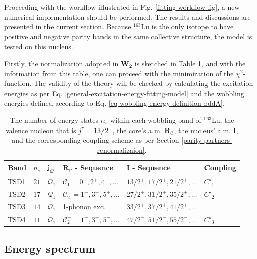 Proceeding with the workflow illustrated in Fig. \ref{fitting-workflow-fig}, a new numerical implementation should be performed. The results and discussions are presented in the current section. Because $^{163}$Lu is the only isotope to have positive and negative parity bands in the same collective structure, the model is tested on this nucleus.

Firstly, the normalization adopted in $\mathbf{W_2}$ is sketched in Table \ref{lu163-table-info}, and with the information from this table, one can proceed with the minimization of the $\chi^2$-function. The validity of the theory will be checked by calculating the excitation energies as per Eq. \ref{general-excitation-energy-fitting-model} and the wobbling energies defined according to Eq. \ref{eq-wobbling-energy-definition-oddA}.
\begin{table}
    \centering
    \begin{tabular}{llllll}
    \hline
    Band & $n_s$ & $\mathbf{j}_\mathcal{Q}$ & $\mathbf{R}_\mathscr{C}$ - Sequence & $\mathbf{I}$ - Sequence & Coupling  \\
    \hline
    \hline
    TSD1 & $21$ & $\mathcal{Q}_1$ & $\mathscr{C}_1=0^+,2^+,4^+,\dots$   & $13/2^+,17/2^+,21/2^+,\dots$ & $C'_1$        \\
    TSD2 & $17$ & $\mathcal{Q}_1$ & $\mathscr{C}_2^+=1^+,3^+,5^+,\dots$ & $27/2^+,31/2^+,35/2^+,\dots$ & $C'_2$        \\
    TSD3 & $14$ & $\mathcal{Q}_1$ & 1-phonon exc.                       & $33/2^+,37/2^+,41/2^+,\dots$ & \\
    TSD4 & $11$ & $\mathcal{Q}_1$ & $\mathscr{C}_2^-=1^-,3^-,5^-,\dots$ & $47/2^-,51/2^-,55/2^-,\dots$ & $C'_3$        \\
    \hline
    \end{tabular}
    \caption{The number of energy states $n_s$ within each wobbling band of $^{163}$Lu, the valence nucleon that is $j^\pi=13/2^+$, the core's a.m. $\mathbf{R}_\mathscr{C}$, the nucleus' a.m. $\mathbf{I}$, and the corresponding coupling scheme as per Section \ref{parity-partners-renormalizaion}.}
    \label{lu163-table-info}
\end{table}

\subsection{Energy spectrum}

